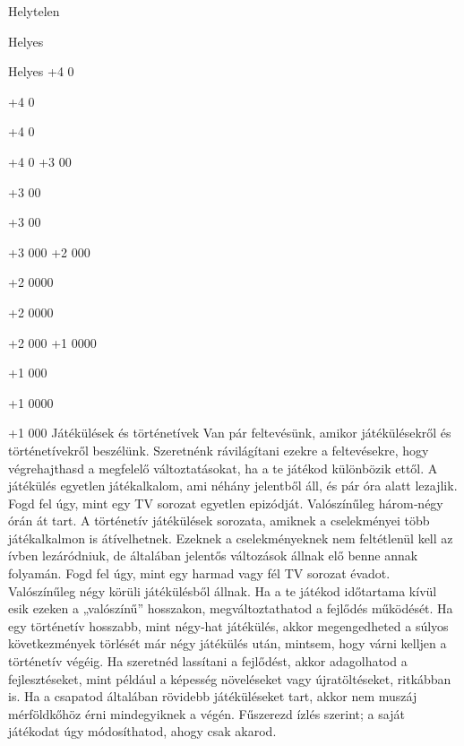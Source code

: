 \documentclass[oneside]{book}
\begin{document}
Helytelen

Helyes

Helyes
+4
0

+4
0

+4
0

+4
0
+3
00

+3
00

+3
00

+3
000
+2
000

+2
0000

+2
0000

+2
000
+1
0000

+1
000

+1
0000

+1
000
Játékülések és történetívek
Van pár feltevésünk, amikor játékülésekről és történetívekről beszélünk. Szeretnénk rávilágítani ezekre a feltevésekre, hogy végrehajthasd a megfelelő változtatásokat, ha a te játékod különbözik ettől.
A játékülés egyetlen játékalkalom, ami néhány jelentből áll, és pár óra alatt lezajlik. Fogd fel úgy, mint egy TV sorozat egyetlen epizódját. Valószínűleg három‑négy órán át tart.
A történetív játékülések sorozata, amiknek a cselekményei több játékalkalmon is átívelhetnek. Ezeknek a cselekményeknek nem feltétlenül kell az ívben lezáródniuk, de általában jelentős változások állnak elő benne annak folyamán. Fogd fel úgy, mint egy harmad vagy fél TV sorozat évadot. Valószínűleg négy körüli játékülésből állnak.
Ha a te játékod időtartama kívül esik ezeken a „valószínű” hosszakon, megváltoztathatod a fejlődés működését.  Ha egy történetív hosszabb, mint négy‑hat játékülés, akkor megengedheted a súlyos következmények törlését már négy játékülés után, mintsem, hogy várni kelljen a történetív végéig. Ha szeretnéd lassítani a fejlődést, akkor adagolhatod a fejlesztéseket, mint például a képesség növeléseket vagy újratöltéseket, ritkábban is. Ha a csapatod általában rövidebb játéküléseket tart, akkor nem muszáj mérföldkőhöz érni mindegyiknek a végén. Fűszerezd ízlés szerint; a saját játékodat úgy módosíthatod, ahogy csak akarod.
\end{document}
